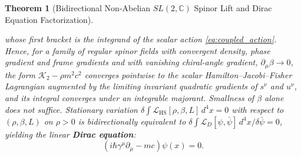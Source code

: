 \documentclass[11pt, a4paper]{article}
\newtheorem{theorem}{Theorem}[section]
\theoremstyle{definition}
\begin{document}
\begin{theorem}[Bidirectional Non-Abelian $SL(2,\mathbb{C})$ Spinor Lift and Dirac Equation Factorization]
\begin{enumerate}[label=(\roman*)]
    whose first bracket is the integrand of the scalar action \eqref{eq:coupled_action}. Hence, for a family of regular spinor fields with convergent density, phase gradient and frame gradients and with vanishing chiral-angle gradient, $\partial_\mu \beta \to 0$, the form $\mathcal{K}_2 - \rho m^2 c^2$ converges pointwise to the scalar Hamilton--Jacobi--Fisher Lagrangian augmented by the limiting invariant quadratic gradients of $s^\nu$ and $u^\nu$, and its integral converges under an integrable majorant. Smallness of $\beta$ alone does not suffice. Stationary variation $\delta \int \mathcal{L}_{\text{HS}}[\rho, \beta, L]\,d^4x = 0$ with respect to $(\rho, \beta, L)$ on $\rho > 0$ is bidirectionally equivalent to $\delta \int \mathcal{L}_D[\psi, \bar{\psi}]\,d^4x / \delta\bar{\psi} = 0$, yielding the linear \textbf{Dirac equation}:
    \begin{equation}
    \label{eq:dirac}
    \left( i\hbar \gamma^\mu \partial_\mu - mc \right) \psi(x) = 0.
    \end{equation}
\end{enumerate}
\end{theorem}
\end{document}
